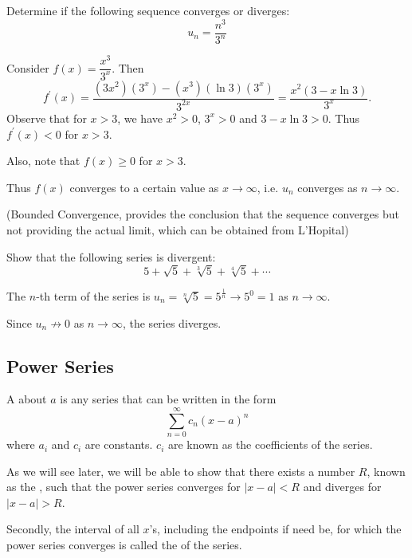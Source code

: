 \begin{exercise}{}{}
Determine if the following sequence converges or diverges:
\[ u_n=\frac{n^3}{3^n} \]
\end{exercise}

\begin{solution}
Consider $f(x)=\dfrac{x^3}{3^x}$. Then
\[ f^\prime(x)=\frac{(3x^2)(3^x)-(x^3)(\ln3)(3^x)}{3^{2x}}=\frac{x^2(3-x\ln3)}{3^x}. \]
Observe that for $x>3$, we have $x^2>0$, $3^x>0$ and $3-x\ln3>0$. Thus $f^\prime(x)<0$ for $x>3$.

Also, note that $f(x)\ge0$ for $x>3$. 

Thus $f(x)$ converges to a certain value as $x\to\infty$, i.e. $u_n$ converges as $n\to\infty$.

(Bounded Convergence, provides the conclusion that the sequence converges but not providing the actual limit, which can be obtained from L'Hopital)
\end{solution}

\begin{exercise}{}{}
Show that the following series is divergent:
\[ 5+\sqrt{5}+\sqrt[3]{5}+\sqrt[4]{5}+\cdots \]
\end{exercise}

\begin{solution}
The $n$-th term of the series is $u_n=\sqrt[n]{5}=5^\frac{1}{n}\to5^0=1$ as $n\to\infty$.

Since $u_n\not\to0$ as $n\to\infty$, the series diverges.
\end{solution}

\subsection{Power Series}
\begin{definition}
A  about $a$ is any series that can be written in the form
\[ \sum_{n=0}^\infty c_n(x-a)^n \]
where $a_i$ and $c_i$ are constants. $c_i$ are known as the coefficients of the series.
\end{definition}

As we will see later, we will be able to show that there exists a number $R$, known as the , such that the power series converges for $|x-a|<R$ and diverges for $|x-a|>R$.

Secondly, the interval of all $x$'s, including the endpoints if need be, for which the power series converges is called the  of the series.

